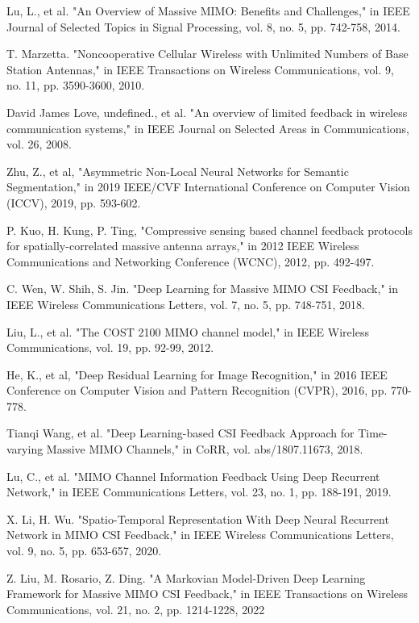 \documentclass[lettersize,journal]{IEEEtran}
\begin{document}
\begin{thebibliography}{00}
	Lu, L., et al. "An Overview of Massive MIMO: Benefits and Challenges," in IEEE Journal of Selected Topics in Signal Processing, vol. 8, no. 5, pp. 742-758, 2014.
	
	T. Marzetta. "Noncooperative Cellular Wireless with Unlimited Numbers of Base Station Antennas," in IEEE Transactions on Wireless Communications, vol. 9, no. 11, pp. 3590-3600, 2010.
	
	David James Love, undefined., et al. "An overview of limited feedback in wireless communication systems," in IEEE Journal on Selected Areas in Communications, vol. 26, 2008.
	
	Zhu, Z., et al, "Asymmetric Non-Local Neural Networks for Semantic Segmentation," in 2019 IEEE/CVF International Conference on Computer Vision (ICCV), 2019, pp. 593-602.
	
	P. Kuo, H. Kung, P. Ting, "Compressive sensing based channel feedback protocols for spatially-correlated massive antenna arrays," in 2012 IEEE Wireless Communications and Networking Conference (WCNC), 2012, pp. 492-497.
	
	C. Wen, W. Shih, S. Jin. "Deep Learning for Massive MIMO CSI Feedback," in IEEE Wireless Communications Letters, vol. 7, no. 5, pp. 748-751, 2018.
	
	Liu, L., et al. "The COST 2100 MIMO channel model," in IEEE Wireless Communications, vol. 19, pp. 92-99, 2012.
	
	He, K., et al, "Deep Residual Learning for Image Recognition," in 2016 IEEE Conference on Computer Vision and Pattern Recognition (CVPR), 2016, pp. 770-778.
	
	Tianqi Wang, et al. "Deep Learning-based CSI Feedback Approach for Time-varying Massive MIMO Channels," in CoRR, vol. abs/1807.11673, 2018.
	
	
	Lu, C., et al. "MIMO Channel Information Feedback Using Deep Recurrent Network," in IEEE Communications Letters, vol. 23, no. 1, pp. 188-191, 2019.
	
	X. Li, H. Wu. "Spatio-Temporal Representation With Deep Neural Recurrent Network in MIMO CSI Feedback," in IEEE Wireless Communications Letters, vol. 9, no. 5, pp. 653-657, 2020.
	
	Z. Liu, M. Rosario, Z. Ding. "A Markovian Model-Driven Deep Learning Framework for Massive MIMO CSI Feedback," in IEEE Transactions on Wireless Communications, vol. 21, no. 2, pp. 1214-1228, 2022
	

\end{thebibliography}
\end{document}
